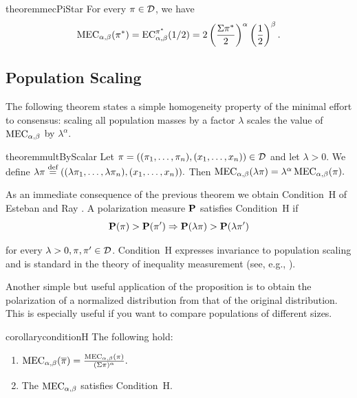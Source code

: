 \begin{restatable}{theorem}{mecPiStar}\label{th:mec-pi-star}
For every $\pi \in \mathcal{D}$, we have
\[
\MEC(\pi^*)
=
\EC[\alpha,\beta][\pi^*](1/2)
=
2\left(\frac{\Mass{\pi^*}}{2}\right)^\alpha
\left(\frac{1}{2}\right)^\beta .
\]
\end{restatable}

\subsection{Population Scaling}

The following theorem states a simple homogeneity property of the minimal effort to consensus: scaling all population masses by a factor $\lambda$ scales the value of $\MEC$ by $\lambda^{\alpha}$.

\begin{restatable}{theorem}{multByScalar}\label{th:multbyscalar}
Let $\pi=((\pi_1,\ldots,\pi_n),(x_1,\ldots,x_n))\in\mathcal{D}$ and let $\lambda>0$.
We define
\(
\lambda\pi \stackrel{\text{def}}{=} ((\lambda\pi_1,\ldots,\lambda\pi_n),(x_1,\ldots,x_n)).
\)
Then
\(
\MEC(\lambda\pi)=\lambda^{\alpha}\MEC(\pi).
\)
\end{restatable}

As an immediate consequence of the previous theorem we obtain
Condition~H of Esteban and Ray \cite{esteban1994measurement}. 
A polarization measure $\mathbf{P}$ satisfies Condition~H if
\begin{equation}\label{eq:condition-H}    
\mathbf{P}(\pi)>\mathbf{P}(\pi') \Rightarrow \mathbf{P}(\lambda\pi)>\mathbf{P}(\lambda\pi')
\end{equation}

for every $\lambda>0,\pi,\pi' \in \mathcal{D}$. Condition~H expresses invariance to population scaling and is
standard in the theory of inequality measurement (see, e.g., \cite{foster85}). 

Another simple but useful application of the proposition is to obtain the polarization of a normalized distribution from that of the original distribution. This is especially useful if you want to compare populations of different sizes.  

\begin{restatable}{corollary}{conditionH}\label{cor:condition-H-normalization}
The following hold: 
\begin{enumerate}
\item $\MEC(\overline{\pi})=\frac{\MEC(\pi)}{(\Mass{\pi})^{\alpha}}.$
\item The $\MEC$ satisfies Condition~H.
\end{enumerate}
\end{restatable}
